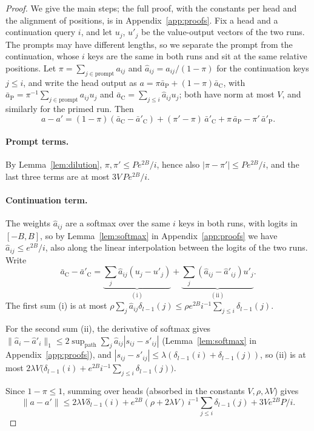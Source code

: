 \documentclass[11pt]{article}
\theoremstyle{definition}
\theoremstyle{remark}
\begin{document}
\begin{proof}
We give the main steps; the full proof, with the constants per head and the alignment of positions, is in Appendix~\ref{app:proofs}. Fix a head and a continuation query $i$, and let $u_j$, $u'_j$ be the value-output vectors of the two runs. The prompts may have different lengths, so we separate the prompt from the continuation, whose $i$ keys are the same in both runs and sit at the same relative positions. Let $\pi=\sum_{j\in\text{prompt}}a_{ij}$ and $\hat a_{ij}=a_{ij}/(1-\pi)$ for the continuation keys $j\le i$, and write the head output as $a=\pi\bar a_{\mathrm P}+(1-\pi)\bar a_{\mathrm C}$, with $\bar a_{\mathrm P}=\pi^{-1}\sum_{j\in\text{prompt}}a_{ij}u_j$ and $\bar a_{\mathrm C}=\sum_{j\le i}\hat a_{ij}u_j$; both have norm at most $V$, and similarly for the primed run. Then
\[
a-a'=(1-\pi)(\bar a_{\mathrm C}-\bar a'_{\mathrm C})+(\pi'-\pi)\,\bar a'_{\mathrm C}+\pi\,\bar a_{\mathrm P}-\pi'\,\bar a'_{\mathrm P}.
\]

\paragraph{Prompt terms.} By Lemma~\ref{lem:dilution}, $\pi,\pi'\le Pe^{2B}/i$, hence also $|\pi-\pi'|\le Pe^{2B}/i$, and the last three terms are at most $3V\,Pe^{2B}/i$.

\paragraph{Continuation term.} The weights $\hat a_{ij}$ are a softmax over the same $i$ keys in both runs, with logits in $[-B,B]$, so by Lemma~\ref{lem:softmax} in Appendix~\ref{app:proofs} we have $\hat a_{ij}\le e^{2B}/i$, also along the linear interpolation between the logits of the two runs. Write
\[
\bar a_{\mathrm C}-\bar a'_{\mathrm C}=\underbrace{\sum_j\hat a_{ij}(u_j-u'_j)}_{(\mathrm{i})}+\underbrace{\sum_j(\hat a_{ij}-\hat a'_{ij})u'_j}_{(\mathrm{ii})}.
\]
The first sum (i) is at most $\rho\sum_j\hat a_{ij}\delta_{l-1}(j)\le\rho e^{2B}i^{-1}\sum_{j\le i}\delta_{l-1}(j)$.

For the second sum (ii), the derivative of softmax gives $\|\hat a_i-\hat a'_i\|_1\le2\sup_{\text{path}}\sum_j\hat a_{ij}|s_{ij}-s'_{ij}|$ (Lemma~\ref{lem:softmax} in Appendix~\ref{app:proofs}), and $|s_{ij}-s'_{ij}|\le\lambda(\delta_{l-1}(i)+\delta_{l-1}(j))$, so (ii) is at most $2\lambda V\big(\delta_{l-1}(i)+e^{2B}i^{-1}\sum_{j\le i}\delta_{l-1}(j)\big)$.

Since $1-\pi\le1$, summing over heads (absorbed in the constants $V,\rho,\lambda V$) gives
\[
\|a-a'\|\le2\lambda V\delta_{l-1}(i)+e^{2B}(\rho+2\lambda V)\,i^{-1}\sum_{j\le i}\delta_{l-1}(j)+3Ve^{2B}P/i.
\]


\end{proof}
\end{document}

